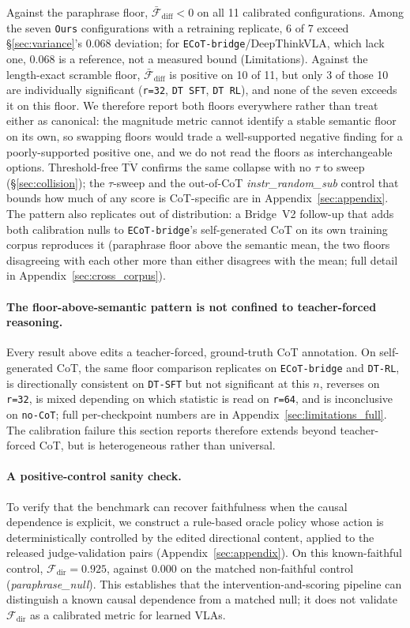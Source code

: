 \documentclass{article}
\begin{document}
Against the paraphrase floor, $\bar{\mathcal{F}}_{\text{diff}} < 0$ on all 11 calibrated configurations. Among the seven \texttt{Ours} configurations with a retraining replicate, 6 of 7 exceed \S\ref{sec:variance}'s $0.068$ deviation; for \texttt{ECoT-bridge}/DeepThinkVLA, which lack one, $0.068$ is a reference, not a measured bound (Limitations). Against the length-exact scramble floor, $\bar{\mathcal{F}}_{\text{diff}}$ is positive on 10 of 11, but only 3 of those 10 are individually significant (\texttt{r=32}, \texttt{DT SFT}, \texttt{DT RL}), and none of the seven exceeds it on this floor. We therefore report both floors everywhere rather than treat either as canonical: the magnitude metric cannot identify a stable semantic floor on its own, so swapping floors would trade a well-supported negative finding for a poorly-supported positive one, and we do not read the floors as interchangeable options. Threshold-free $\overline{\text{TV}}$ confirms the same collapse with no $\tau$ to sweep (\S\ref{sec:collision}); the $\tau$-sweep and the out-of-CoT \emph{instr\_random\_sub} control that bounds how much of any score is CoT-specific are in Appendix~\ref{sec:appendix}. The pattern also replicates out of distribution: a Bridge~V2 follow-up that adds both calibration nulls to \texttt{ECoT-bridge}'s self-generated CoT on its own training corpus reproduces it (paraphrase floor above the semantic mean, the two floors disagreeing with each other more than either disagrees with the mean; full detail in Appendix~\ref{sec:cross_corpus}).

\paragraph{The floor-above-semantic pattern is not confined to teacher-forced reasoning.} Every result above edits a teacher-forced, ground-truth CoT annotation. On self-generated CoT, the same floor comparison replicates on \texttt{ECoT-bridge} and \texttt{DT-RL}, is directionally consistent on \texttt{DT-SFT} but not significant at this $n$, reverses on \texttt{r=32}, is mixed depending on which statistic is read on \texttt{r=64}, and is inconclusive on \texttt{no-CoT}; full per-checkpoint numbers are in Appendix~\ref{sec:limitations_full}. The calibration failure this section reports therefore extends beyond teacher-forced CoT, but is heterogeneous rather than universal.

\paragraph{A positive-control sanity check.} To verify that the benchmark can recover faithfulness when the causal dependence is explicit, we construct a rule-based oracle policy whose action is deterministically controlled by the edited directional content, applied to the released judge-validation pairs (Appendix~\ref{sec:appendix}). On this known-faithful control, $\mathcal{F}_{\text{dir}}=0.925$, against $0.000$ on the matched non-faithful control (\emph{paraphrase\_null}). This establishes that the intervention-and-scoring pipeline can distinguish a known causal dependence from a matched null; it does not validate $\mathcal{F}_{\text{dir}}$ as a calibrated metric for learned VLAs.
\end{document}
